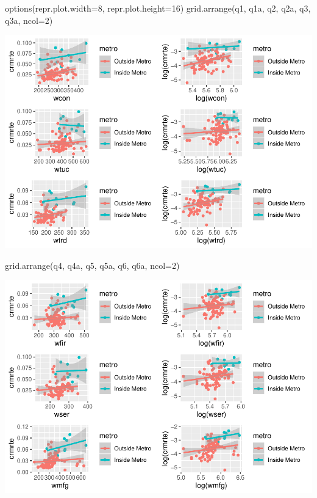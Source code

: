 \documentclass[]{article}
\newenvironment{Shaded}{}{}
\newcommand{\DataTypeTok}[1]{#1}
\newcommand{\DecValTok}[1]{#1}
\newcommand{\KeywordTok}[1]{\textcolor[rgb]{0.00,0.00,1.00}{#1}}
\newcommand{\NormalTok}[1]{#1}
\begin{document}
\begin{Shaded}
\begin{Highlighting}[]
\KeywordTok{options}\NormalTok{(}\DataTypeTok{repr.plot.width=}\DecValTok{8}\NormalTok{, }\DataTypeTok{repr.plot.height=}\DecValTok{16}\NormalTok{)}
\KeywordTok{grid.arrange}\NormalTok{(q1, q1a, q2, q2a, q3, q3a, }\DataTypeTok{ncol=}\DecValTok{2}\NormalTok{)}
\end{Highlighting}
\end{Shaded}

\includegraphics{Bagnard_Gaustad_Hartman_Leung_Lab_3_files/figure-latex/unnamed-chunk-92-1.pdf}

\begin{Shaded}
\begin{Highlighting}[]
\KeywordTok{grid.arrange}\NormalTok{(q4, q4a, q5, q5a, q6, q6a, }\DataTypeTok{ncol=}\DecValTok{2}\NormalTok{)}
\end{Highlighting}
\end{Shaded}

\includegraphics{Bagnard_Gaustad_Hartman_Leung_Lab_3_files/figure-latex/unnamed-chunk-92-2.pdf}
\end{document}
